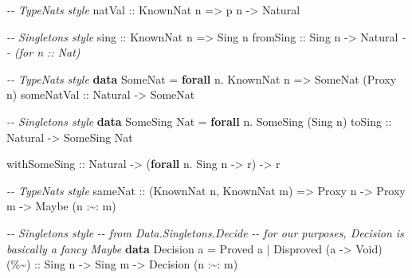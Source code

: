 \documentclass[]{article}
\newenvironment{Shaded}{}{}
\newcommand{\CommentTok}[1]{\textcolor[rgb]{0.38,0.63,0.69}{\textit{#1}}}
\newcommand{\DataTypeTok}[1]{\textcolor[rgb]{0.56,0.13,0.00}{#1}}
\newcommand{\KeywordTok}[1]{\textcolor[rgb]{0.00,0.44,0.13}{\textbf{#1}}}
\newcommand{\NormalTok}[1]{#1}
\newcommand{\OperatorTok}[1]{\textcolor[rgb]{0.40,0.40,0.40}{#1}}
\newcommand{\OtherTok}[1]{\textcolor[rgb]{0.00,0.44,0.13}{#1}}
\begin{document}
\begin{Shaded}
\begin{Highlighting}[]
\CommentTok{{-}{-} TypeNats style}
\OtherTok{natVal ::} \DataTypeTok{KnownNat}\NormalTok{ n }\OtherTok{=\textgreater{}}\NormalTok{ p n }\OtherTok{{-}\textgreater{}} \DataTypeTok{Natural}

\CommentTok{{-}{-} Singletons style}
\OtherTok{sing     ::} \DataTypeTok{KnownNat}\NormalTok{ n }\OtherTok{=\textgreater{}} \DataTypeTok{Sing}\NormalTok{ n}
\OtherTok{fromSing ::} \DataTypeTok{Sing}\NormalTok{ n }\OtherTok{{-}\textgreater{}} \DataTypeTok{Natural}       \CommentTok{{-}{-} (for n :: Nat)}

\CommentTok{{-}{-} TypeNats style}
\KeywordTok{data} \DataTypeTok{SomeNat} \OtherTok{=} \KeywordTok{forall}\NormalTok{ n}\OperatorTok{.} \DataTypeTok{KnownNat}\NormalTok{ n }\OtherTok{=\textgreater{}} \DataTypeTok{SomeNat}\NormalTok{ (}\DataTypeTok{Proxy}\NormalTok{ n)}
\OtherTok{someNatVal ::} \DataTypeTok{Natural} \OtherTok{{-}\textgreater{}} \DataTypeTok{SomeNat}

\CommentTok{{-}{-} Singletons style}
\KeywordTok{data} \DataTypeTok{SomeSing} \DataTypeTok{Nat} \OtherTok{=} \KeywordTok{forall}\NormalTok{ n}\OperatorTok{.} \DataTypeTok{SomeSing}\NormalTok{ (}\DataTypeTok{Sing}\NormalTok{ n)}
\OtherTok{toSing ::} \DataTypeTok{Natural} \OtherTok{{-}\textgreater{}} \DataTypeTok{SomeSing} \DataTypeTok{Nat}

\OtherTok{withSomeSing ::} \DataTypeTok{Natural} \OtherTok{{-}\textgreater{}}\NormalTok{ (}\KeywordTok{forall}\NormalTok{ n}\OperatorTok{.} \DataTypeTok{Sing}\NormalTok{ n }\OtherTok{{-}\textgreater{}}\NormalTok{ r) }\OtherTok{{-}\textgreater{}}\NormalTok{ r}

\CommentTok{{-}{-} TypeNats style}
\OtherTok{sameNat ::}\NormalTok{ (}\DataTypeTok{KnownNat}\NormalTok{ n, }\DataTypeTok{KnownNat}\NormalTok{ m) }\OtherTok{=\textgreater{}} \DataTypeTok{Proxy}\NormalTok{ n }\OtherTok{{-}\textgreater{}} \DataTypeTok{Proxy}\NormalTok{ m }\OtherTok{{-}\textgreater{}} \DataTypeTok{Maybe}\NormalTok{ (n }\OperatorTok{:\textasciitilde{}:}\NormalTok{ m)}

\CommentTok{{-}{-} Singletons style}
\CommentTok{{-}{-} from Data.Singletons.Decide}
\CommentTok{{-}{-} for our purposes, Decision is basically a fancy Maybe}
\KeywordTok{data} \DataTypeTok{Decision}\NormalTok{ a }\OtherTok{=} \DataTypeTok{Proved}\NormalTok{ a }\OperatorTok{|} \DataTypeTok{Disproved}\NormalTok{ (a }\OtherTok{{-}\textgreater{}} \DataTypeTok{Void}\NormalTok{)}
\OtherTok{(\%\textasciitilde{}) ::} \DataTypeTok{Sing}\NormalTok{ n }\OtherTok{{-}\textgreater{}} \DataTypeTok{Sing}\NormalTok{ m }\OtherTok{{-}\textgreater{}} \DataTypeTok{Decision}\NormalTok{ (n }\OperatorTok{:\textasciitilde{}:}\NormalTok{ m)}
\end{Highlighting}
\end{Shaded}
\end{document}
